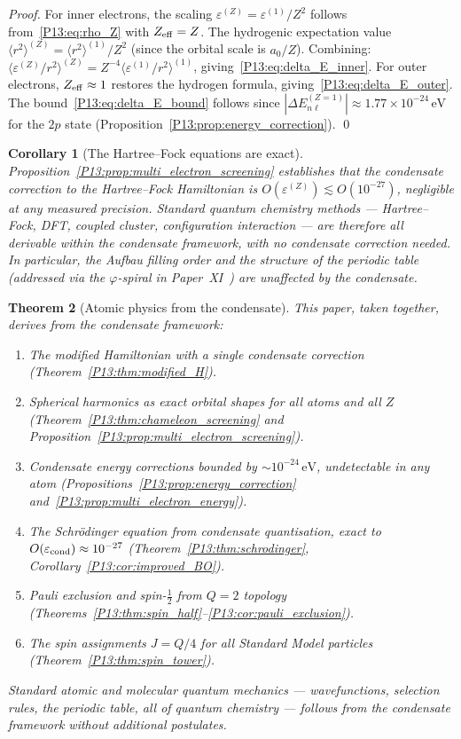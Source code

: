 \documentclass[11pt,a4paper]{article}
\newtheorem{theorem}{Theorem}[section]
\newtheorem{corollary}[theorem]{Corollary}
\theoremstyle{definition}
\theoremstyle{remark}
\newcommand{\vp}{\varphi}
\newcommand{\eps}{\varepsilon}
\begin{document}
\begin{proof}
For inner electrons, the scaling $\eps^{(Z)}=\eps^{(1)}/Z^2$
follows from~\eqref{P13:eq:rho_Z} with $Z_{\rm eff}=Z$.
The hydrogenic expectation value $\langle r^2\rangle^{(Z)}=\langle r^2\rangle^{(1)}/Z^2$
(since the orbital scale is $a_0/Z$).
Combining: $\langle\eps^{(Z)}/r^2\rangle^{(Z)}=Z^{-4}\langle\eps^{(1)}/r^2\rangle^{(1)}$,
giving~\eqref{P13:eq:delta_E_inner}.
For outer electrons, $Z_{\rm eff}\approx1$ restores the hydrogen formula,
giving~\eqref{P13:eq:delta_E_outer}.
The bound~\eqref{P13:eq:delta_E_bound} follows since
$|\Delta E_{n\ell}^{(Z=1)}|\approx1.77\times10^{-24}\,\mathrm{eV}$
for the $2p$ state (Proposition~\ref{P13:prop:energy_correction}).
\qed
\end{proof}

\begin{corollary}[The Hartree--Fock equations are exact]
\label{P13:cor:HF_exact}
Proposition~\ref{P13:prop:multi_electron_screening} establishes that the
condensate correction to the Hartree--Fock Hamiltonian is
$O(\eps^{(Z)})\lesssim O(10^{-27})$, negligible at any measured precision.
Standard quantum chemistry methods --- Hartree--Fock, DFT, coupled cluster,
configuration interaction --- are therefore all derivable within the
condensate framework, with no condensate correction needed.
In particular, the Aufbau filling order and the structure of the
periodic table (addressed via the $\vp$-spiral in Paper~XI~\cite{Paper11})
are unaffected by the condensate.
\end{corollary}

\begin{theorem}[Atomic physics from the condensate]
\label{P13:thm:atomic_foundation}
This paper, taken together, derives from the condensate framework:
\begin{enumerate}[noitemsep]
\item The modified Hamiltonian with a single condensate correction
  (Theorem~\ref{P13:thm:modified_H}).
\item Spherical harmonics as exact orbital shapes for all atoms and all $Z$
  (Theorem~\ref{P13:thm:chameleon_screening} and
  Proposition~\ref{P13:prop:multi_electron_screening}).
\item Condensate energy corrections bounded by $\sim10^{-24}\,\mathrm{eV}$,
  undetectable in any atom (Propositions~\ref{P13:prop:energy_correction}
  and~\ref{P13:prop:multi_electron_energy}).
\item The Schr\"odinger equation from condensate quantisation,
  exact to $O(\eps_{\rm cond})\approx10^{-27}$
  (Theorem~\ref{P13:thm:schrodinger}, Corollary~\ref{P13:cor:improved_BO}).
\item Pauli exclusion and spin-$\tfrac{1}{2}$ from $Q=2$ topology
  (Theorems~\ref{P13:thm:spin_half}--\ref{P13:cor:pauli_exclusion}).
\item The spin assignments $J=Q/4$ for all Standard Model particles
  (Theorem~\ref{P13:thm:spin_tower}).
\end{enumerate}
Standard atomic and molecular quantum mechanics --- wavefunctions,
selection rules, the periodic table, all of quantum chemistry ---
follows from the condensate framework without additional postulates.
\end{theorem}
\end{document}
